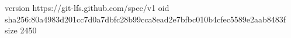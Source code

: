 version https://git-lfs.github.com/spec/v1
oid sha256:80a4983d201cc7d0a7dbfc28b99cca8ead2e7bfbc010b4cfec5589e2aab8483f
size 2450
